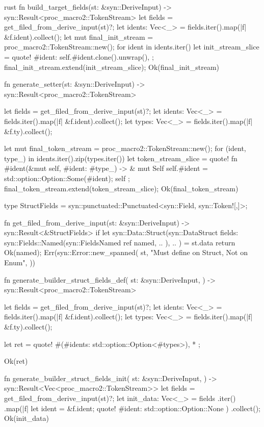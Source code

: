 \begin{code-block}{rust}
fn build_target_fields(st: &syn::DeriveInput) -> syn::Result<proc_macro2::TokenStream> {
    let fields = get_filed_from_derive_input(st)?;
    let idents: Vec<_> = fields.iter().map(|f| &f.ident).collect();
    let mut final_init_stream = proc_macro2::TokenStream::new();
    for ident in idents.iter() {
        let init_stream_slice = quote! {
            #ident: self.#ident.clone().unwrap(),
        };
        final_init_stream.extend(init_stream_slice);
    }
    Ok(final_init_stream)
}

fn generate_setter(st: &syn::DeriveInput) -> syn::Result<proc_macro2::TokenStream> {
    let fields = get_filed_from_derive_input(st)?;
    let idents: Vec<_> = fields.iter().map(|f| &f.ident).collect();
    let types: Vec<_> = fields.iter().map(|f| &f.ty).collect();

    let mut final_token_stream = proc_macro2::TokenStream::new();
    for (ident, type_) in idents.iter().zip(types.iter()) {
        let token_stream_slice = quote! {
            fn #ident(&mut self, #ident: #type_) -> & mut Self {
                self.#ident = std::option::Option::Some(#ident);
                self
            }
        };
        final_token_stream.extend(token_stream_slice);
    }
    Ok(final_token_stream)
}

type StructFields = syn::punctuated::Punctuated<syn::Field, syn::Token![,]>;

fn get_filed_from_derive_input(st: &syn::DeriveInput) -> syn::Result<&StructFields> {
    if let syn::Data::Struct(syn::DataStruct {
        fields: syn::Fields::Named(syn::FieldsNamed { ref named, .. }),
        ..
    }) = st.data
    {
        return Ok(named);
    }
    Err(syn::Error::new_spanned(
        st,
        "Must define on Struct, Not on Enum",
    ))
}

fn generate_builder_struct_fields_def(
    st: &syn::DeriveInput,
) -> syn::Result<proc_macro2::TokenStream> {
    let fields = get_filed_from_derive_input(st)?;
    let idents: Vec<_> = fields.iter().map(|f| &f.ident).collect();
    let types: Vec<_> = fields.iter().map(|f| &f.ty).collect();

    let ret = quote! {
        #(#idents: std::option::Option<#types>), *
    };

    Ok(ret)
}

fn generate_builder_struct_fields_init(
    st: &syn::DeriveInput,
) -> syn::Result<Vec<proc_macro2::TokenStream>> {
    let fields = get_filed_from_derive_input(st)?;
    let init_data: Vec<_> = fields
        .iter()
        .map(|f| {
            let ident = &f.ident;
            quote! {
                #ident: std::option::Option::None
            }
        })
        .collect();
    Ok(init_data)
}
\end{code-block}

